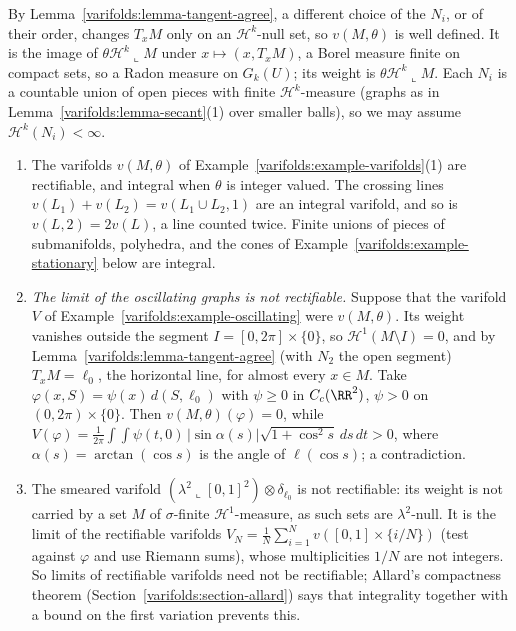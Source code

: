 By Lemma~\ref{varifolds:lemma-tangent-agree}, a different choice of the $N_i$, or of their order, changes $T_xM$ only on an $\mathcal{H}^k$-null set, so $v(M, \theta)$ is well defined. It is the image of
$\theta\mathcal{H}^k\llcorner M$ under $x \mapsto (x, T_xM)$, a Borel measure finite on compact sets, so a Radon measure on $G_k(U)$; its weight is $\theta\mathcal{H}^k\llcorner M$. Each $N_i$ is a countable
union of open pieces with finite $\mathcal{H}^k$-measure (graphs as in Lemma~\ref{varifolds:lemma-secant}(1) over smaller balls), so we may assume $\mathcal{H}^k(N_i) < \infty$.

\begin{example}\label{varifolds:example-rectifiable}
\begin{enumerate}
\item The varifolds $v(M, \theta)$ of Example~\ref{varifolds:example-varifolds}(1) are rectifiable, and integral when $\theta$ is integer valued. The crossing lines $v(L_1) + v(L_2) = v(L_1 \cup L_2, 1)$ are
an integral varifold, and so is $v(L, 2) = 2v(L)$, a line counted twice. Finite unions of pieces of submanifolds, polyhedra, and the cones of Example~\ref{varifolds:example-stationary} below are integral.
\item \emph{The limit of the oscillating graphs is not rectifiable.} Suppose that the varifold $V$ of Example~\ref{varifolds:example-oscillating} were $v(M, \theta)$. Its weight vanishes outside the segment
$I = [0, 2\pi] \times \{0\}$, so $\mathcal{H}^1(M \setminus I) = 0$, and by Lemma~\ref{varifolds:lemma-tangent-agree} (with $N_2$ the open segment) $T_xM = \ell_0$, the horizontal line, for almost every
$x \in M$. Take $\varphi(x, S) = \psi(x)\,d(S, \ell_0)$ with $\psi \geq 0$ in $C_c(\RR^2)$, $\psi > 0$ on $(0, 2\pi) \times \{0\}$. Then $v(M, \theta)(\varphi) = 0$, while
$V(\varphi) = \frac1{2\pi}\int\int\psi(t, 0)\,|\sin\alpha(s)|\sqrt{1 + \cos^2s}\,ds\,dt > 0$, where $\alpha(s) = \arctan(\cos s)$ is the angle of $\ell(\cos s)$; a contradiction.
\item The smeared varifold $(\lambda^2\llcorner[0, 1]^2) \otimes \delta_{\ell_0}$ is not rectifiable: its weight is not carried by a set $M$ of $\sigma$-finite $\mathcal{H}^1$-measure, as such sets are
$\lambda^2$-null. It is the limit of the rectifiable varifolds $V_N = \frac1N\sum_{i=1}^Nv([0, 1] \times \{i/N\})$ (test against $\varphi$ and use Riemann sums), whose multiplicities $1/N$ are not integers.
So limits of rectifiable varifolds need not be rectifiable; Allard's compactness theorem (Section~\ref{varifolds:section-allard}) says that integrality together with a bound on the first variation prevents
this.
\end{enumerate}
\end{example}

